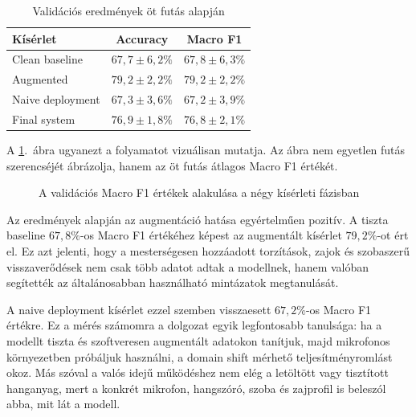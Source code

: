 \begin{table}[H]
\centering
\caption{Validációs eredmények öt futás alapján}
\label{tab:validation_summary}
\begin{tabular}{lcc}
\toprule
\textbf{Kísérlet} & \textbf{Accuracy} & \textbf{Macro F1} \\
\midrule
Clean baseline & \(67{,}7 \pm 6{,}2\%\) & \(67{,}8 \pm 6{,}3\%\) \\
Augmented & \(79{,}2 \pm 2{,}2\%\) & \(79{,}2 \pm 2{,}2\%\) \\
Naive deployment & \(67{,}3 \pm 3{,}6\%\) & \(67{,}2 \pm 3{,}9\%\) \\
Final system & \(76{,}9 \pm 1{,}8\%\) & \(76{,}8 \pm 2{,}1\%\) \\
\bottomrule
\end{tabular}
\end{table}

A \ref{fig:macro_f1_trend}.~ábra ugyanezt a folyamatot vizuálisan mutatja. Az ábra nem egyetlen futás szerencséjét ábrázolja, hanem az öt futás átlagos Macro F1 értékét.

\begin{figure}[H]
\centering
{}
\caption{A validációs Macro F1 értékek alakulása a négy kísérleti fázisban}
\label{fig:macro_f1_trend}
\end{figure}

Az eredmények alapján az augmentáció hatása egyértelműen pozitív. A tiszta baseline \(67{,}8\%\)-os Macro F1 értékéhez képest az augmentált kísérlet \(79{,}2\%\)-ot ért el. Ez azt jelenti, hogy a mesterségesen hozzáadott torzítások, zajok és szobaszerű visszaverődések nem csak több adatot adtak a modellnek, hanem valóban segítették az általánosabban használható mintázatok megtanulását.

A naive deployment kísérlet ezzel szemben visszaesett \(67{,}2\%\)-os Macro F1 értékre. Ez a mérés számomra a dolgozat egyik legfontosabb tanulsága: ha a modellt tiszta és szoftveresen augmentált adatokon tanítjuk, majd mikrofonos környezetben próbáljuk használni, a domain shift mérhető teljesítményromlást okoz. Más szóval a valós idejű működéshez nem elég a letöltött vagy tisztított hanganyag, mert a konkrét mikrofon, hangszóró, szoba és zajprofil is beleszól abba, mit lát a modell.


